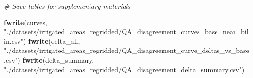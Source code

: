 \documentclass[
  11pt,
]{article}
\newenvironment{Shaded}{\begin{snugshade}}{\end{snugshade}}
\newcommand{\CommentTok}[1]{\textcolor[rgb]{0.56,0.35,0.01}{\textit{#1}}}
\newcommand{\FunctionTok}[1]{\textcolor[rgb]{0.13,0.29,0.53}{\textbf{#1}}}
\newcommand{\NormalTok}[1]{#1}
\newcommand{\StringTok}[1]{\textcolor[rgb]{0.31,0.60,0.02}{#1}}
\begin{document}
\begin{Shaded}
\begin{Highlighting}[]
\CommentTok{\# Save tables for supplementary materials {-}{-}{-}{-}{-}{-}{-}{-}{-}{-}{-}{-}{-}{-}{-}{-}{-}{-}{-}{-}{-}{-}{-}{-}{-}{-}{-}{-}{-}{-}{-}{-}{-}{-}{-}{-}{-}{-}}

\FunctionTok{fwrite}\NormalTok{(curves,}
       \StringTok{"./datasets/irrigated\_areas\_regridded/QA\_disagreement\_curves\_base\_near\_bilin.csv"}\NormalTok{)}
\FunctionTok{fwrite}\NormalTok{(delta\_all,}
       \StringTok{"./datasets/irrigated\_areas\_regridded/QA\_disagreement\_curve\_deltas\_vs\_base.csv"}\NormalTok{)}
\FunctionTok{fwrite}\NormalTok{(delta\_summary,}
       \StringTok{"./datasets/irrigated\_areas\_regridded/QA\_disagreement\_delta\_summary.csv"}\NormalTok{)}
\end{Highlighting}
\end{Shaded}
\end{document}
